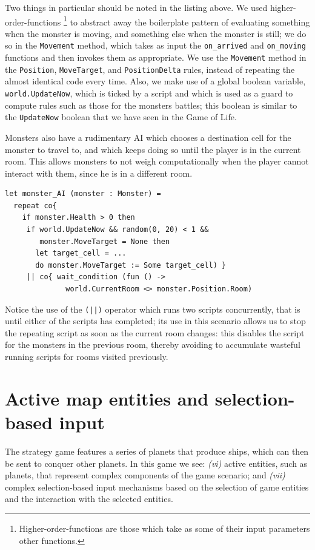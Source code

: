 Two things in particular should be noted in the listing above. We used higher-order-functions \footnote{Higher-order-functions are those which take as some of their input parameters other functions.} to abstract away the boilerplate pattern of evaluating something when the monster is moving, and something else when the monster is still; we do so in the \texttt{Movement} method, which takes as input the \texttt{on\_arrived} and \texttt{on\_moving} functions and then invokes them as appropriate. We use the \texttt{Movement} method in the \texttt{Position}, \texttt{MoveTarget}, and \texttt{PositionDelta} rules, instead of repeating the almost identical code every time. Also, we make use of a global boolean variable, \texttt{world.UpdateNow}, which is ticked by a script and which is used as a guard to compute rules such as those for the monsters battles; this boolean is similar to the \texttt{UpdateNow} boolean that we have seen in the Game of Life. 

Monsters also have a rudimentary AI which chooses a destination cell for the monster to travel to, and which keeps doing so until the player is in the current room. This allows monsters to not weigh computationally when the player cannot interact with them, since he is in a different room. 

\begin{lstlisting}
let monster_AI (monster : Monster) = 
  repeat co{ 
    if monster.Health > 0 then  
     if world.UpdateNow && random(0, 20) < 1 && 
        monster.MoveTarget = None then 
       let target_cell = ...
       do monster.MoveTarget := Some target_cell) } 
     || co{ wait_condition (fun () -> 
              world.CurrentRoom <> monster.Position.Room)
\end{lstlisting}

Notice the use of the \texttt{(||)} operator which runs two scripts concurrently, that is until either of the scripts has completed; its use in this scenario allows us to stop the repeating script as soon as the current room changes: this disables the script for the monsters in the previous room, thereby avoiding to accumulate wasteful running scripts for rooms visited previously.

\section{Active map entities and selection-based input} 
The strategy game features a series of planets that produce ships, which can then be sent to conquer other planets. In this game we see: \textit{(vi)} active entities, such as planets, that represent complex components of the game scenario; and \textit{(vii)} complex selection-based input mechanisms based on the selection of game entities and the interaction with the selected entities.

